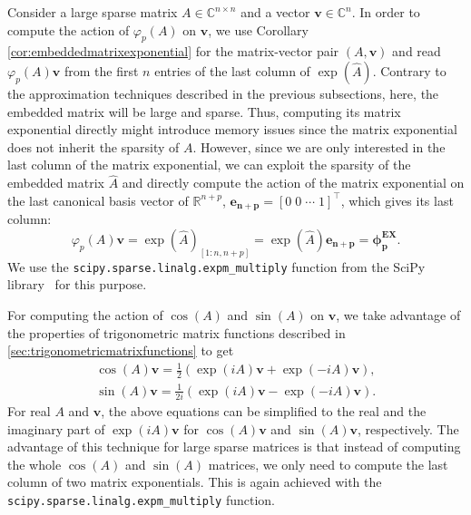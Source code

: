 Consider a large sparse matrix $A \in \mathbb{C}^{n \times n}$ and a vector $\mathbf{v} \in \mathbb{C}^n$.
In order to compute the action of $\varphi_p(A)$ on $\mathbf{v}$, we use Corollary
\ref{cor:embeddedmatrixexponential} for the matrix-vector pair $(A, \mathbf{v})$ and
read $\varphi_p(A) \mathbf{v}$ from the first $n$ entries of the last column of $\exp(\hat{A})$.
Contrary to the approximation techniques described in the previous subsections, here,
the embedded matrix will be large and sparse.
Thus, computing its matrix exponential directly might introduce memory issues
since the matrix exponential does not inherit the sparsity of $A$.
However, since we are only interested in the last column of the matrix exponential,
we can exploit the sparsity of the embedded matrix $\hat{A}$ and directly compute
the action of the matrix exponential on the last canonical basis vector of $\mathbb{R}^{n+p}$,
$\mathbf{e_{n+p}} = [0\;0\;\cdots\;1]^\top$, which gives its last column:
\begin{equation*}
    \varphi_p(A) \mathbf{v} = \exp(\hat{A})_{[1 : n, n+p]} = \exp(\hat{A}) \mathbf{e_{n+p}} = \mathbf{\phi_{p}^{EX}}.
\end{equation*}
We use the \texttt{scipy.sparse.linalg.expm\_multiply} function from
the SciPy library~\cite{SciPy2020} for this purpose.

For computing the action of $\cos(A)$ and $\sin(A)$ on $\mathbf{v}$, we take advantage of the properties
of trigonometric matrix functions described in \autoref{sec:trigonometricmatrixfunctions} to get
\begin{gather*}
    \cos(A) \mathbf{v} = \frac{1}{2}(\exp(iA)\mathbf{v} + \exp(-iA)\mathbf{v}),\\
    \sin(A) \mathbf{v} = \frac{1}{2i}(\exp(iA)\mathbf{v} - \exp(-iA)\mathbf{v}).
\end{gather*}
For real $A$ and $\mathbf{v}$, the above equations can be simplified to the real and
the imaginary part of $\exp(iA)\mathbf{v}$ for $\cos(A)\mathbf{v}$ and $\sin(A)\mathbf{v}$,
respectively.
The advantage of this technique for large sparse matrices is that instead of computing
the whole $\cos(A)$ and $\sin(A)$ matrices, we only need to compute the last column of two
matrix exponentials. This is again achieved with the
\texttt{scipy.sparse.linalg.expm\_multiply} function.

